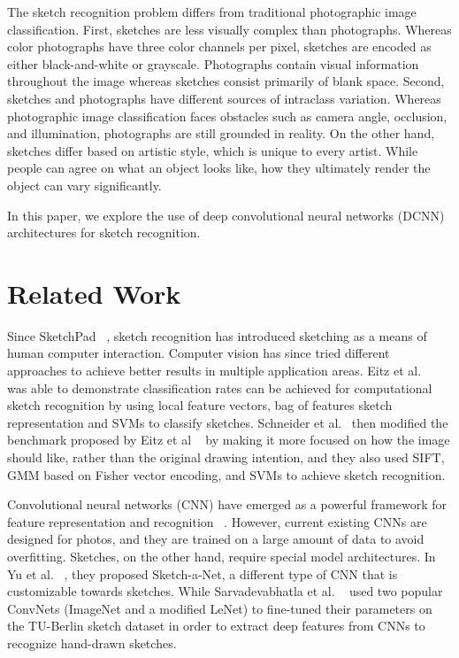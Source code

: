 \documentclass[10pt,twocolumn,letterpaper]{article}
\begin{document}
The sketch recognition problem differs from traditional photographic image classification. First, sketches are less visually complex than photographs. Whereas color photographs have three color channels per pixel, sketches are encoded as either black-and-white or grayscale. Photographs contain visual information throughout the image whereas sketches consist primarily of blank space. Second, sketches and photographs have different sources of intraclass variation. Whereas photographic image classification faces obstacles such as camera angle, occlusion, and illumination, photographs are still grounded in reality. On the other hand, sketches differ based on artistic style, which is unique to every artist. While people can agree on what an object looks like, how they ultimately render the object can vary significantly.

In this paper, we explore the use of deep convolutional neural networks (DCNN) architectures for sketch recognition.

\section{Related Work}

Since SketchPad ~\cite{sutherland1964sketchpad}, sketch recognition has introduced sketching as a means of human computer interaction. Computer vision has since tried different approaches to achieve better results in multiple application areas. Eitz et al. ~\cite{eitz2012hdhso} was able to demonstrate classification rates can be achieved for computational sketch recognition by using local feature vectors, bag of features sketch representation and SVMs to classify sketches. Schneider et al.~\cite{schneider2014sketch} then modified the benchmark proposed by Eitz et al ~\cite{eitz2012hdhso}  by making it more focused on how the image should like, rather than the original drawing intention, and they also used SIFT, GMM based on Fisher vector encoding, and SVMs to achieve sketch recognition.

Convolutional neural networks (CNN) have emerged as a powerful framework for feature representation and recognition ~\cite{krizhevsky2012imagenet}. However, current existing CNNs are designed for photos, and they are trained on a large amount of data to avoid overfitting.  Sketches, on the other hand, require special model architectures. In Yu et al. ~\cite{yu2016sketch}, they proposed Sketch-a-Net, a different type of CNN that is customizable towards sketches. While Sarvadevabhatla et al. ~\cite{sarvadevabhatla2015freehand} used two popular ConvNets (ImageNet and a modified LeNet) to fine-tuned their parameters on the TU-Berlin sketch dataset in order to extract deep features from CNNs to recognize hand-drawn sketches. 
\end{document}
